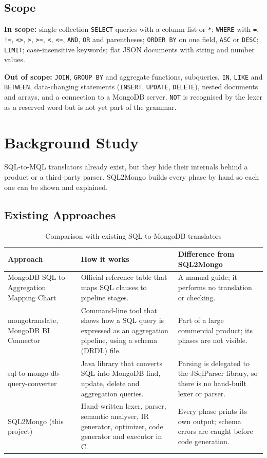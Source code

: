 \documentclass[12pt,a4paper]{report}
\newcommand{\codeus}{\textunderscore\allowbreak}
\DeclareRobustCommand{\code}[1]{\texttt{\let\_\codeus #1}}
\begin{document}
\section{Scope}
\textbf{In scope:} single-collection \code{SELECT} queries with a column list or \code{*}; \code{WHERE} with \code{=}, \code{!=}, \code{<>}, \code{>}, \code{>=}, \code{<}, \code{<=}, \code{AND}, \code{OR} and parentheses; \code{ORDER BY} on one field, \code{ASC} or \code{DESC}; \code{LIMIT}; case-insensitive keywords; flat JSON documents with string and number values.

\textbf{Out of scope:} \code{JOIN}, \code{GROUP BY} and aggregate functions, subqueries, \code{IN}, \code{LIKE} and \code{BETWEEN}, data-changing statements (\code{INSERT}, \code{UPDATE}, \code{DELETE}), nested documents and arrays, and a connection to a MongoDB server. \code{NOT} is recognised by the lexer as a reserved word but is not yet part of the grammar.

\chapter{Background Study}
SQL-to-MQL translators already exist, but they hide their internals behind a product or a third-party parser. SQL2Mongo builds every phase by hand so each one can be shown and explained.

\section{Existing Approaches}
\begin{table}[H]
\centering\small
\begin{tabularx}{\linewidth}{|P{3.4cm}|L|L|}
\hline
\textbf{Approach} & \textbf{How it works} & \textbf{Difference from SQL2Mongo} \\ \hline
MongoDB SQL to Aggregation Mapping Chart \cite{mongo-chart} & Official reference table that maps SQL clauses to pipeline stages. & A manual guide; it performs no translation or checking. \\ \hline
mongotranslate, MongoDB BI Connector \cite{mongotranslate} & Command-line tool that shows how a SQL query is expressed as an aggregation pipeline, using a schema (DRDL) file. & Part of a large commercial product; its phases are not visible. \\ \hline
sql-to-mongo-db-query-converter \cite{russell} & Java library that converts SQL into MongoDB find, update, delete and aggregation queries. & Parsing is delegated to the JSqlParser library, so there is no hand-built lexer or parser. \\ \hline
SQL2Mongo (this project) & Hand-written lexer, parser, semantic analyser, IR generator, optimizer, code generator and executor in C. & Every phase prints its own output; schema errors are caught before code generation. \\ \hline
\end{tabularx}
\caption{Comparison with existing SQL-to-MongoDB translators}
\end{table}
\end{document}
